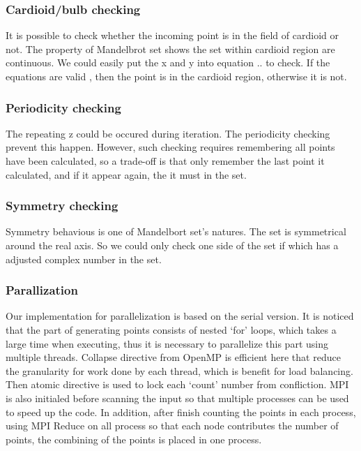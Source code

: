\documentclass[letterpaper,10pt]{article}
\begin{document}
\subsubsection{Cardioid/bulb checking}
It is possible to check whether the incoming point is in the field of cardioid or not. The property of Mandelbrot set shows the set within cardioid region are continuous. We could easily put the x and y into equation .. to check. If the equations are valid , then the point is in the cardioid region, otherwise it is not.

\subsubsection{Periodicity checking}
The repeating z could be occured during iteration. The periodicity checking prevent this happen. However, such checking requires remembering all points have been calculated, so a trade-off is that only remember  the last point it calculated, and if it appear again, the it must in the set.

\subsubsection{Symmetry checking}
Symmetry behavious is one of Mandelbort set’s natures. The set is symmetrical around the real axis. So we could only check one side of the set if which has a adjusted complex number in the set.

\subsubsection{Parallization}
Our implementation for parallelization is based on the serial version. It is noticed that the part of generating points consists of nested ‘for’ loops, which takes a large time when executing, thus it is necessary to parallelize this part using multiple threads. Collapse directive from OpenMP is efficient here that reduce the granularity for work done by each thread, which is benefit for load balancing. Then atomic directive is used to lock each ‘count’ number from confliction. MPI is also initialed before scanning the input so that multiple processes can be used to speed up the code. In addition, after finish counting the points in each process, using MPI Reduce on all process so that each node contributes the number of points, the combining of the points is placed in one process. 
\end{document}
